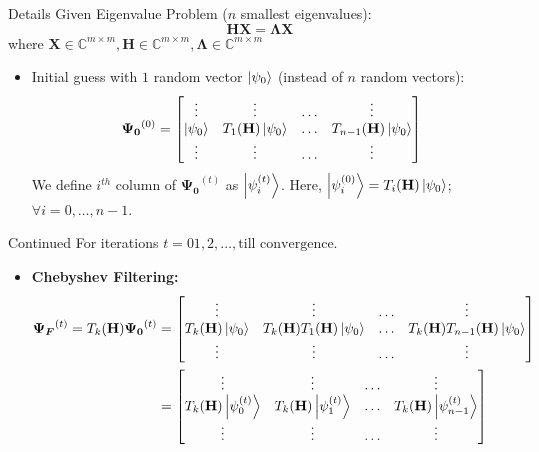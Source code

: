 \documentclass[serif, aspectratio=169]{beamer}
\begin{document}
\begin{frame}{Details}
    Given Eigenvalue Problem ($n$ smallest eigenvalues):
    \[
    \mathbf{HX}=\boldsymbol{\Lambda} \mathbf{X}
    \]
    where $\mathbf{X} \in \mathbb{C}^{m\times m},\mathbf{H}\in\mathbb{C}^{m\times m},\boldsymbol{\Lambda}\in\mathbb{C}^{m\times m}$
    \begin{itemize}
        \item Initial guess with $1$ random vector $\ket{\psi_0}$ (instead of $n$ random vectors):
        \[
        \boldsymbol{\Psi_0}^{(0)}=\begin{bmatrix}
            \vdots & \vdots & \ldots & \vdots \\
            \ket{\psi_0} & T_1(\mathbf{H})\ket{\psi_0} & \ldots & T_{n-1}(\mathbf{H})\ket{\psi_0}\\
            \vdots & \vdots & \ldots & \vdots 
        \end{bmatrix}
        \]
        We define $i^{th}$ column of $\boldsymbol{\Psi_0}^{(t)}$ as $\ket{\psi_i^{(t)}}$. Here, $\ket{\psi_i^{(0)}}=T_i(\mathbf{H})\ket{\psi_0}$; $\forall i=0,\ldots,n-1$.
    \end{itemize}
\end{frame}
\begin{frame}{Continued}
    For iterations $t=01,2,\ldots,\text{till convergence}$.
    \begin{itemize}
        \item \textbf{Chebyshev Filtering:}
        \begin{align*}
        \boldsymbol{\Psi_F}^{(t)}=T_k (\mathbf{H})\boldsymbol{\Psi_0}^{(t)}& = \begin{bmatrix}
            \vdots & \vdots & \ldots & \vdots \\
            T_k(\mathbf{H})\ket{\psi_0} & T_k(\mathbf{H})T_1(\mathbf{H})\ket{\psi_0} & \ldots & T_k(\mathbf{H})T_{n-1}(\mathbf{H})\ket{\psi_0} \\
            \vdots & \vdots & \ldots & \vdots
        \end{bmatrix}\\
        &=\begin{bmatrix}
        \vdots & \vdots & \ldots & \vdots \\
        T_k(\mathbf{H})\ket{\psi_0^{(t)}} & T_k(\mathbf{H})\ket{\psi_1^{(t)}} & \ldots & T_k(\mathbf{H})\ket{\psi_{n-1}^{(t)}}\\
        \vdots & \vdots & \ldots & \vdots
        \end{bmatrix}
        \end{align*}
   \end{itemize}
\end{frame}
\end{document}
